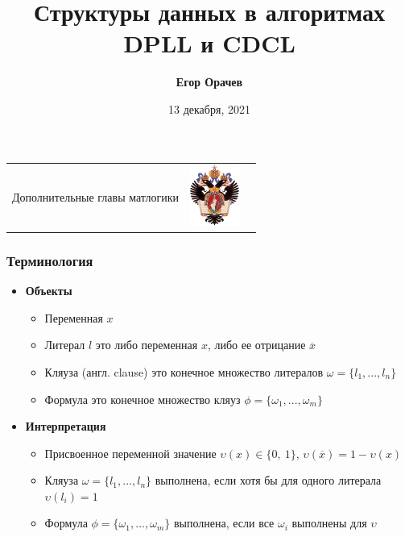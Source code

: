 \documentclass[aspectratio=169,xcolor=table,english]{beamer}
\title[DPLL \& CDCL]{Структуры данных в алгоритмах DPLL и CDCL}
\institute[СПбГУ]{
Санкт-Петербургский Государственный университет
}
\author[Егор Орачев]{\textbf{Егор Орачев}}
\date{13 декабря, 2021}
\begin{document}
{
\begin{frame}[fragile]
  \begin{table}
  \centering
  \begin{tabularx}{\linewidth}{YcX}
     \begin{minipage}[t]{0.7\textwidth}\center \vspace{-1cm} 
     Дополнительные главы матлогики
      \end{minipage}
    & \hfill \includegraphics[height=2.0cm]{pictures/SPbGU_Logo.png}
  \end{tabularx}
  \end{table}
  \titlepage
\end{frame}
}

\begin{frame}[fragile] \frametitle{Терминология}
    \begin{itemize}
        \item \textbf{Объекты}
        \begin{itemize}
            \item Переменная $x$
            \item Литерал $l$ это либо переменная $x$, либо ее отрицание $\overline{x}$
            \item Кляуза (англ. clause) это конечное множество литералов $\omega = \{l_1, ..., l_n\}$
            \item Формула это конечное множество кляуз $\phi = \{ \omega_1, ..., \omega_m\}$
        \end{itemize}
        \item \textbf{Интерпретация}
        \begin{itemize}
            \item Присвоенное переменной значение $\upsilon(x) \in \{0,~1\}$, $\upsilon(\overline{x})=1-\upsilon(x)$
            \item Кляуза $\omega = \{l_1, ..., l_n\}$ выполнена, если хотя бы для одного литерала $\upsilon(l_i)=1$
            \item Формула $\phi = \{ \omega_1, ..., \omega_m\}$ выполнена, если все $\omega_i$ выполнены для $\upsilon$
        \end{itemize}
    \end{itemize}
\end{frame}
\end{document}
